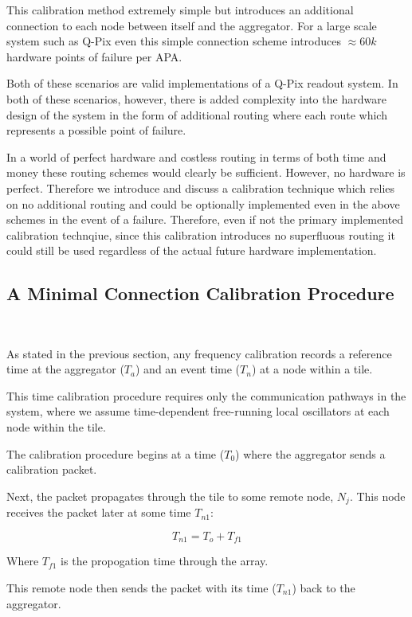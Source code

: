 This calibration method extremely simple but introduces an additional connection to each node between itself and the aggregator.
For a large scale system such as Q-Pix even this simple connection scheme introduces $\approx 60k$ hardware points of failure per APA.

Both of these scenarios are valid implementations of a Q-Pix readout system.
In both of these scenarios, however, there is added complexity into the hardware design of the system in the form of additional routing where each route which represents a possible point of failure.

In a world of perfect hardware and costless routing in terms of both time and money these routing schemes would clearly be sufficient.
However, no hardware is perfect.
Therefore we introduce and discuss a calibration technique which relies on no additional routing and could be optionally implemented even in the above schemes in the event of a failure.
Therefore, even if not the primary implemented calibration technqiue, since this calibration introduces no superfluous routing it could still be used regardless of the actual future hardware implementation.

\subsection{A Minimal Connection Calibration Procedure}~\label{sec:min_calib}

As stated in the previous section, any frequency calibration records a reference time at the aggregator ($T_{a}$) and an event time ($T_{n}$) at a node within a tile.

This time calibration procedure requires only the communication pathways in the system, where we assume time-dependent free-running local oscillators at each node within the tile.

The calibration procedure begins at a time ($T_{0}$) where the aggregator sends a calibration packet.

Next, the packet propagates through the tile to some remote node, $N_{j}$.
This node receives the packet later at some time $T_{n1}$:

\begin{equation}
  T_{n1} = T_{o} + T_{f1}
\end{equation}

Where $T_{f1}$ is the propogation time through the array.

This remote node then sends the packet with its time ($T_{n1}$) back to the aggregator.

